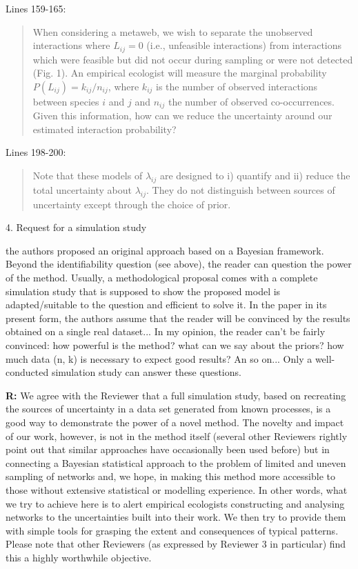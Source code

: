 \documentclass[12pt]{letter}
\newenvironment{refquote}{\bigskip \begin{it}}{\end{it}\smallskip}
\begin{document}
		Lines 159-165:


		\begin{quotation}
			When considering a metaweb, we wish to separate the unobserved interactions where $L_{ij}=0$ (i.e., unfeasible interactions) from interactions which were feasible but did not occur during sampling or  were not detected (Fig. 1). An empirical ecologist will measure the marginal probability $P(L_{ij})=k_{ij}/n_{ij}$, where $k_{ij}$ is the number of observed interactions between species $i$ and $j$ and $n_{ij}$ the number of observed co-occurrences. Given this information, how can we reduce the uncertainty around our estimated interaction probability?
		\end{quotation}


		Lines 198-200:


		\begin{quotation}
			 Note that these models of $\lambda_{ij}$ are designed to i) quantify and ii) reduce the total uncertainty about $\lambda_{ij}$. They do not distinguish between sources of uncertainty except through the choice of prior.
		\end{quotation}


	4. Request for a simulation study 


		\begin{refquote}
			the authors proposed an original approach based on a Bayesian framework. Beyond the identifiability question (see above), the reader can question the power of the method. Usually, a methodological proposal comes with a complete simulation study that is supposed to show  the proposed model is adapted/suitable to the question and efficient to solve it. In the paper in its present form, the authors assume that the reader will be convinced by the results obtained on a single real dataset... In my opinion, the reader can't be fairly convinced: how powerful is the method? what can we say about the priors? how much data (n, k) is necessary to expect good results? An so on... Only a well-conducted simulation study can answer these questions.
		\end{refquote}


		\textbf{R:} We agree with the Reviewer that a full simulation study, based on recreating the sources of uncertainty in a data set generated from known processes, is a good way to demonstrate the power of a novel method. The novelty and impact of our work, however, is not in the method itself (several other Reviewers rightly point out that similar approaches have occasionally been used before) but in connecting a Bayesian statistical approach to the problem of limited and uneven sampling of networks and, we hope, in making this method more accessible to those without extensive statistical or modelling experience. In other words, what we try to achieve here is to alert empirical ecologists constructing and analysing networks to the uncertainties built into their work. We then try to provide them with simple tools for grasping the extent and consequences of typical patterns. Please note that other Reviewers (as expressed by Reviewer 3 in particular) find this a highly worthwhile objective. 
\end{document}
